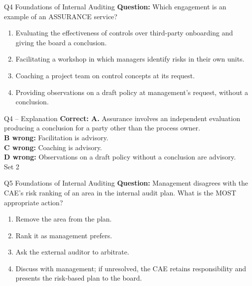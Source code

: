 \documentclass[aspectratio=169,10pt]{beamer}
\begin{document}
\begin{frame}[t]{Q4 \hfill {\scriptsize Foundations of Internal Auditing}}
	\small
	\textbf{Question:} Which engagement is an example of an ASSURANCE service?
	\begin{enumerate}[label=\Alph*.,itemsep=1pt,topsep=3pt]
			\item Evaluating the effectiveness of controls over third-party onboarding and giving the board a conclusion.
			\item Facilitating a workshop in which managers identify risks in their own units.
			\item Coaching a project team on control concepts at its request.
			\item Providing observations on a draft policy at management's request, without a conclusion.
	\end{enumerate}
\end{frame}

\begin{frame}[t]{Q4 -- Explanation}
	\footnotesize
	\textbf{Correct: A.} Assurance involves an independent evaluation producing a conclusion for a party other than the process owner. \\[5pt]
\textbf{B wrong:} Facilitation is advisory. \\[3pt]
\textbf{C wrong:} Coaching is advisory. \\[3pt]
\textbf{D wrong:} Observations on a draft policy without a conclusion are advisory. \\[3pt]
	\vfill {\tiny Set 2}
\end{frame}

\begin{frame}[t]{Q5 \hfill {\scriptsize Foundations of Internal Auditing}}
	\small
	\textbf{Question:} Management disagrees with the CAE's risk ranking of an area in the internal audit plan. What is the MOST appropriate action?
	\begin{enumerate}[label=\Alph*.,itemsep=1pt,topsep=3pt]
			\item Remove the area from the plan.
			\item Rank it as management prefers.
			\item Ask the external auditor to arbitrate.
			\item Discuss with management; if unresolved, the CAE retains responsibility and presents the risk-based plan to the board.
	\end{enumerate}
\end{frame}
\end{document}
